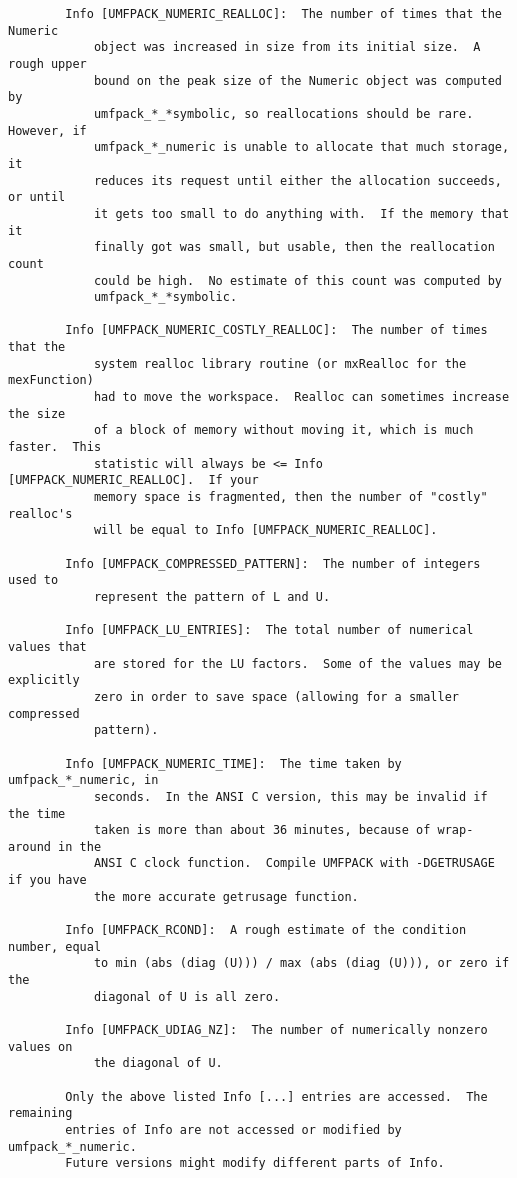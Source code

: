 {\begin{verbatim}
        Info [UMFPACK_NUMERIC_REALLOC]:  The number of times that the Numeric
            object was increased in size from its initial size.  A rough upper
            bound on the peak size of the Numeric object was computed by
            umfpack_*_*symbolic, so reallocations should be rare.  However, if
            umfpack_*_numeric is unable to allocate that much storage, it
            reduces its request until either the allocation succeeds, or until
            it gets too small to do anything with.  If the memory that it
            finally got was small, but usable, then the reallocation count
            could be high.  No estimate of this count was computed by
            umfpack_*_*symbolic.

        Info [UMFPACK_NUMERIC_COSTLY_REALLOC]:  The number of times that the
            system realloc library routine (or mxRealloc for the mexFunction)
            had to move the workspace.  Realloc can sometimes increase the size
            of a block of memory without moving it, which is much faster.  This
            statistic will always be <= Info [UMFPACK_NUMERIC_REALLOC].  If your
            memory space is fragmented, then the number of "costly" realloc's
            will be equal to Info [UMFPACK_NUMERIC_REALLOC].

        Info [UMFPACK_COMPRESSED_PATTERN]:  The number of integers used to
            represent the pattern of L and U.

        Info [UMFPACK_LU_ENTRIES]:  The total number of numerical values that
            are stored for the LU factors.  Some of the values may be explicitly
            zero in order to save space (allowing for a smaller compressed
            pattern).

        Info [UMFPACK_NUMERIC_TIME]:  The time taken by umfpack_*_numeric, in
            seconds.  In the ANSI C version, this may be invalid if the time
            taken is more than about 36 minutes, because of wrap-around in the
            ANSI C clock function.  Compile UMFPACK with -DGETRUSAGE if you have
            the more accurate getrusage function.

        Info [UMFPACK_RCOND]:  A rough estimate of the condition number, equal
            to min (abs (diag (U))) / max (abs (diag (U))), or zero if the
            diagonal of U is all zero.

        Info [UMFPACK_UDIAG_NZ]:  The number of numerically nonzero values on
            the diagonal of U.

        Only the above listed Info [...] entries are accessed.  The remaining
        entries of Info are not accessed or modified by umfpack_*_numeric.
        Future versions might modify different parts of Info.
\end{verbatim}
}

